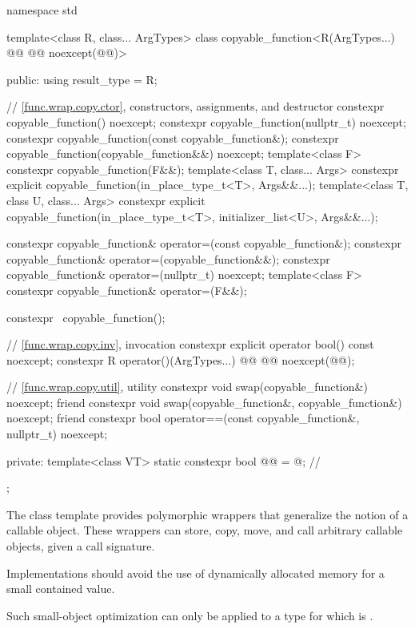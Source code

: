 \begin{codeblock}
namespace std {
  template<class R, class... ArgTypes>
  class copyable_function<R(ArgTypes...) @\cv{}@ @@ noexcept(@@)> {
  public:
    using result_type = R;

    // \ref{func.wrap.copy.ctor}, constructors, assignments, and destructor
    constexpr copyable_function() noexcept;
    constexpr copyable_function(nullptr_t) noexcept;
    constexpr copyable_function(const copyable_function&);
    constexpr copyable_function(copyable_function&&) noexcept;
    template<class F> constexpr copyable_function(F&&);
    template<class T, class... Args>
      constexpr explicit copyable_function(in_place_type_t<T>, Args&&...);
    template<class T, class U, class... Args>
      constexpr explicit copyable_function(in_place_type_t<T>, initializer_list<U>, Args&&...);

    constexpr copyable_function& operator=(const copyable_function&);
    constexpr copyable_function& operator=(copyable_function&&);
    constexpr copyable_function& operator=(nullptr_t) noexcept;
    template<class F> constexpr copyable_function& operator=(F&&);

    constexpr ~copyable_function();

    // \ref{func.wrap.copy.inv}, invocation
    constexpr explicit operator bool() const noexcept;
    constexpr R operator()(ArgTypes...) @\cv{}@ @@ noexcept(@@);

    // \ref{func.wrap.copy.util}, utility
    constexpr void swap(copyable_function&) noexcept;
    friend constexpr void swap(copyable_function&, copyable_function&) noexcept;
    friend constexpr bool operator==(const copyable_function&, nullptr_t) noexcept;

  private:
    template<class VT>
      static constexpr bool @@ = @\seebelow@;       // \expos
  };
}
\end{codeblock}

\pnum
The  class template provides polymorphic wrappers that generalize the notion of a callable object. These wrappers can store, copy, move, and call arbitrary callable objects, given a call signature.

\pnum
\recommended
Implementations should avoid the use of dynamically allocated memory for a small contained value.
\begin{note}
Such small-object optimization can only be applied to a type  for which  is .
\end{note}

